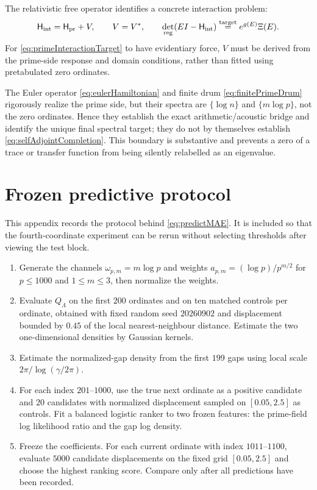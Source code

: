 \documentclass[11pt]{amsart}
\theoremstyle{definition}
\theoremstyle{remark}
\begin{document}
The relativistic free operator identifies a concrete interaction problem:
\begin{equation}\label{eq:primeInteractionTarget}
 \mathsf H_{\rm int}=\mathsf H_{\rm pr}+V,
 \qquad V=V^*,
 \qquad
 \det_{\rm reg}(EI-\mathsf H_{\rm int})
 \stackrel{\rm target}{=}e^{g(E)}\Xi(E).
\end{equation}
For \eqref{eq:primeInteractionTarget} to have evidentiary force, $V$ must be derived from
the prime-side response and domain conditions, rather than fitted using pretabulated zero
ordinates.

The Euler operator \eqref{eq:eulerHamiltonian} and finite drum
\eqref{eq:finitePrimeDrum} rigorously realize the prime side, but their spectra are
$\{\log n\}$ and $\{m\log p\}$, not the zero ordinates.  Hence they establish the exact
arithmetic/acoustic bridge and identify the unique final spectral target; they do not by
themselves establish \eqref{eq:selfAdjointCompletion}.  This boundary is substantive and
prevents a zero of a trace or transfer function from being silently relabelled as an
eigenvalue.

\section{Frozen predictive protocol}
This appendix records the protocol behind \eqref{eq:predictMAE}.  It is included so that the
fourth-coordinate experiment can be rerun without selecting thresholds after viewing the test
block.

\begin{enumerate}[leftmargin=*]
\item Generate the channels $\omega_{p,m}=m\log p$ and weights
$a_{p,m}=(\log p)/p^{m/2}$ for $p\le1000$ and $1\le m\le3$, then normalize the weights.
\item Evaluate $Q_\Lambda$ on the first $200$ ordinates and on ten matched controls per ordinate,
obtained with fixed random seed $20260902$ and displacement bounded by $0.45$ of the local
nearest-neighbour distance.  Estimate the two one-dimensional densities by Gaussian kernels.
\item Estimate the normalized-gap density from the first $199$ gaps using local scale
$2\pi/\log(\gamma/2\pi)$.
\item For each index $201$--$1000$, use the true next ordinate as a positive candidate and
$20$ candidates with normalized displacement sampled on $[0.05,2.5]$ as controls.  Fit a
balanced logistic ranker to two frozen features: the prime-field log likelihood ratio and the
gap log density.
\item Freeze the coefficients.  For each current ordinate with index $1011$--$1100$, evaluate
$5000$ candidate displacements on the fixed grid $[0.05,2.5]$ and choose the highest ranking
score.  Compare only after all predictions have been recorded.
\end{enumerate}
\end{document}
